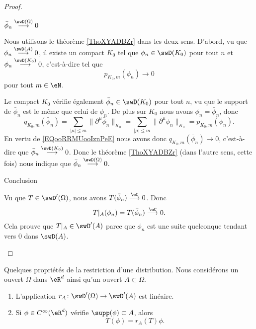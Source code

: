 \begin{proof}
\begin{subproof}
\item[$ \bar\phi_n\stackrel{\swD(\Omega)}{\longrightarrow}0$ ]

    Nous utilisons le théorème \ref{ThoXYADBZr} dans les deux sens. D'abord, vu que \( \phi_n\stackrel{\swD(A)}{\longrightarrow}0\), il existe un compact \( K_0\) tel que \( \phi_n\in\swD(K_0)\) pour tout \( n\) et \( \phi_n\stackrel{\swD(K_0)}{\longrightarrow}0\), c'est-à-dire tel que
    \begin{equation}        \label{EQooRRMUooIznPeE}
        p_{K_0,m}(\phi_n)\to 0
    \end{equation}
    pour tout \( m\in \eN\).

    Le compact \( K_0\) vérifie également \( \bar\phi_n\in \swD(K_0)\) pour tout \( n\), vu que le support de \( \bar\phi_n\) est le même que celui de \( \phi_n\). De plus sur \( K_0\) nous avons \( \phi_n=\bar\phi_n\), donc
    \begin{equation}
        q_{K_0,m}(\bar\phi_n)=\sum_{| \mu |\leq m}\| \partial^{\mu}\bar\phi_n \|_{K_0}=\sum_{| \mu |\leq m}\| \partial^{\mu}\phi_n \|_{K_0}=p_{K_0,m}(\phi_n).
    \end{equation}
    En vertu de \eqref{EQooRRMUooIznPeE} nous avons donc \( q_{K_0,m}(\bar\phi_n)\to 0\), c'est-à-dire que \( \bar\phi_n\stackrel{\swD(K_0)}{\longrightarrow}0\). Donc le théorème \ref{ThoXYADBZr} (dans l'autre sens, cette fois) nous indique que \( \bar\phi_n\stackrel{\swD(\Omega)}{\longrightarrow}0\).


\item[Conclusion]

    Vu que \( T\in \swD'(\Omega)\), nous avons \( T(\bar\phi_n)\stackrel{\eC}{\longrightarrow}0\). Donc
    \begin{equation}
        T|_A(\phi_n)=T(\bar\phi_n)\stackrel{\eC}{\longrightarrow}0.
    \end{equation}
    Cela prouve que \( T|_A\in \swD'(A)\) parce que \( \phi_n\) est une suite quelconque tendant vers \( 0\) dans \( \swD(A)\).
    \end{subproof}
\end{proof}


\begin{lemma}       \label{LEMooCXIZooAbeMpF}
    Quelques propriétés de la restriction d'une distribution. Nous considérons un ouvert \( \Omega\) dans \( \eR^d\) ainsi qu'un ouvert \( A\subset \Omega\).
    \begin{enumerate}
        \item
        L'application \( r_A\colon \swD'(\Omega)\to \swD'(A)\) est linéaire.
    \item       \label{ITEMooGXSKooYomqpg}
        Si \( \phi\in  C^{\infty}(\eR^d)\) vérifie \( \supp(\phi)\subset A\), alors
        \begin{equation}
            T(\phi)=r_A(T)\phi.
        \end{equation}
    \end{enumerate}
\end{lemma}


